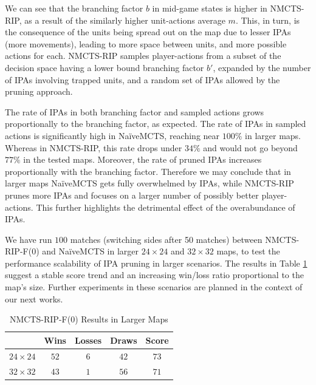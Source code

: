 \documentclass[conference]{IEEEtran}
\begin{document}
We can see that the branching factor $b$ in mid-game states is higher in NMCTS-RIP, as a result of the similarly higher unit-actions average $m$. This, in turn, is the consequence of the units being spread out on the map due to lesser IPAs (more movements), leading to more space between units, and more possible actions for each. NMCTS-RIP samples player-actions from a subset of the decision space having a lower bound branching factor $b'$, expanded by the number of IPAs involving trapped units, and a random set of IPAs allowed by the pruning approach.

The rate of IPAs in both branching factor and sampled actions grows proportionally to the branching factor, as expected. The rate of IPAs in sampled actions is significantly high in NaïveMCTS, reaching near $100\%$ in larger maps. Whereas in NMCTS-RIP, this rate drops under $34\%$ and would not go beyond $77\%$ in the tested maps. Moreover, the rate of pruned IPAs increases proportionally with the branching factor. Therefore we may conclude that in larger maps NaïveMCTS gets fully overwhelmed by IPAs, while NMCTS-RIP prunes more IPAs and focuses on a larger number of possibly better player-actions. This further highlights the detrimental effect of the overabundance of IPAs.

We have run $100$ matches (switching sides after 50 matches) between NMCTS-RIP-F($0$) and NaïveMCTS in larger $24\times24$ and $32\times32$ maps, to test the performance scalability of IPA pruning in larger scenarios. The results in Table \ref{largeMaps} suggest a stable score trend and an increasing win/loss ratio proportional to the map's size. Further experiments in these scenarios are planned in the context of our next works.

\begin{table}[!t]
\caption{NMCTS-RIP-F($0$) Results in Larger Maps}
\label{largeMaps}
\renewcommand{\arraystretch}{1.3}
\centering
\begin{tabular}{c|c|c|c|c} 
\cline{2-5}
\multicolumn{1}{c|}{} & Wins & Losses & Draws & Score  \\ 
\hline \hline
$24\times24$ & $52$ & $6$ & $42$ & $73$ \\
$32\times32$ & $43$ & $1$ & $56$ & $71$ \\
\hline
\end{tabular}
\end{table}

\end{document}
